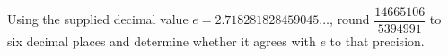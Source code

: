 Using the supplied decimal value $e=2.718281828459045\ldots$, round $\dfrac{14665106}{5394991}$ to six decimal places and determine whether it agrees with $e$ to that precision.
